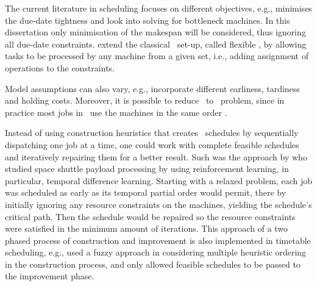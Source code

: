 The current literature in scheduling focuses on different objectives, e.g., 
\citet{Chang96} minimises the due-date tightness and 
\citet{Drobouchevitch2000,Gao2007} look into solving for bottleneck machines. 
In this dissertation only minimisation of the makespan will be considered, thus 
ignoring all due-date constraints. \citet{Brandimarte1993,Xia2005,Pezzella2008} 
extend the classical \JSP\ set-up, called flexible \jsp, by allowing tasks to 
be processed by any machine from a given set, i.e., adding assignment of 
operations to the constraints.

Model assumptions can also vary, e.g., \citet{Thiagarajan05} incorporate different earliness, tardiness and holding costs. 
Moreover, it is possible to reduce \jsp\  to \fsp\ problem, since in practice most jobs in \jsp\ use the machines in the same order \citep{Guinet1998,Ho2007}.

Instead of using construction heuristics that creates \jsp\ schedules by sequentially dispatching one job at a time, one could work with complete feasible schedules and iteratively repairing them for a better result. Such was the approach by \cite{Zhang95} who studied space shuttle payload processing by using reinforcement learning, in particular, temporal difference learning. Starting with a relaxed problem, each job was scheduled as early as its temporal partial order would permit, there by initially ignoring any resource constraints on the machines, yielding the schedule's critical path. Then the schedule would be repaired so the resource constraints were satisfied in the minimum amount of iterations.
This approach of a two phased process of construction and improvement is also implemented in timetable scheduling, e.g., \citet{Asmuni09} used a fuzzy approach in considering multiple heuristic ordering in the construction process, and only allowed feasible schedules to be passed to the improvement phase. 

